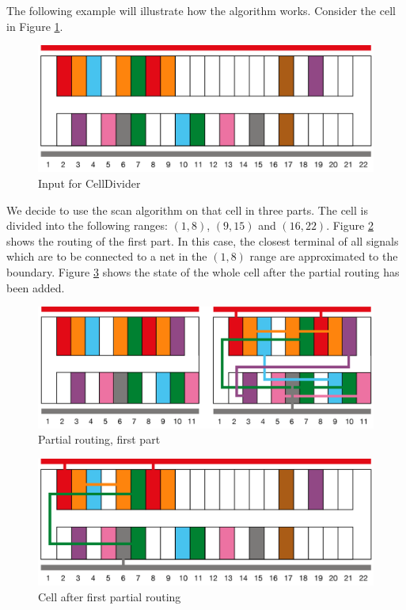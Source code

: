 The following example will illustrate how the algorithm works. Consider the cell in Figure \ref{fig:scanbase}. \\

\begin{figure}[h!]
  \centering
  \includegraphics[scale=0.5]{img/design/scanbase.png}
  \caption{Input for CellDivider}
  \label{fig:scanbase}
\end{figure} 
\vspace{10 mm}
We decide to use the scan algorithm on that cell in three parts. The cell is divided into the following ranges: $(1, 8)$, $(9, 15)$ and $(16, 22)$. Figure \ref{fig:scanpart1} shows the routing of the first part. In this case, the closest terminal of all signals which are to be connected to a net in the $(1, 8)$ range are approximated to the boundary. Figure \ref{fig:scantotal1} shows the state of the whole cell after the partial routing has been added. \\

\begin{figure}[h!]
  \centering
  \includegraphics[scale=0.5]{img/design/scanpart1.png}
  \caption{Partial routing, first part}
  \label{fig:scanpart1}
\end{figure} 

\begin{figure}[h!]
  \centering
  \includegraphics[scale=0.5]{img/design/scantotal1.png}
  \caption{Cell after first partial routing}
  \label{fig:scantotal1}
\end{figure} 

